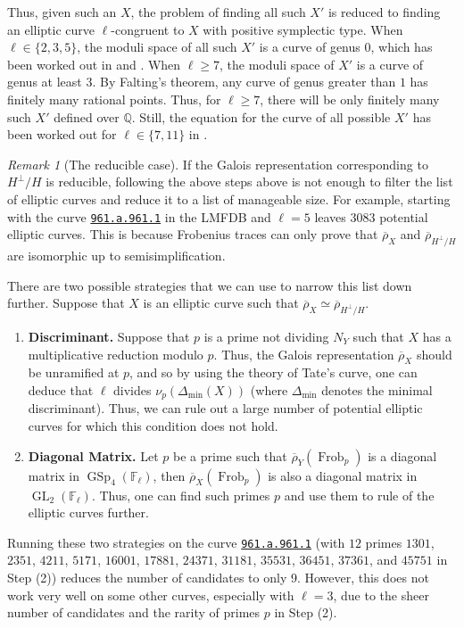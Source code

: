 \documentclass{amsproc}
\numberwithin{equation}{section}
\theoremstyle{definition}
\theoremstyle{remark}
\newtheorem{remark}[equation]{Remark}
\DeclareMathOperator{\GL}{GL}
\DeclareMathOperator{\GSp}{GSp}
\DeclareMathOperator{\Frob}{Frob}
\newcommand{\QQ}{\mathbb Q}
\newcommand{\FF}{\mathbb F}
\newcommand{\rhoHperpH}{\overline\rho_{H^\perp\!/H}}
\begin{document}
Thus, given such an $X$, the problem of finding all such $X'$ is reduced to finding an elliptic curve $\ell$-congruent to $X$ with positive symplectic type. When $\ell\in\{2,3,5\}$, the moduli space of all such $X'$ is a curve of genus $0$, which has been worked out in \cite{ec_gluable_family_2} and \cite{ec_gluable_family_3_5}. When $\ell\geq 7$, the moduli space of $X'$ is a curve of genus at least $3$. By Falting's theorem, any curve of genus greater than $1$ has finitely many rational points. Thus, for $\ell\geq 7$, there will be only finitely many such $X'$ defined over $\QQ$. Still, the equation for the curve of all possible $X'$ has been worked out for $\ell\in\{7,11\}$ in \cite{ec_gluable_family_7_11}.

\begin{remark}[The reducible case]
    \label{rmk:reducible}
If the Galois representation corresponding to $H^\perp/H$ is reducible, following the above steps above is not enough to filter the list of elliptic curves and reduce it to a list of manageable size. For example, starting with the curve \href{https://www.lmfdb.org/Genus2Curve/Q/961/a/961/1}{\texttt{961.a.961.1}} in the LMFDB and $\ell=5$ leaves $3083$ potential elliptic curves. This is because Frobenius traces can only prove that $\overline\rho_X$ and $\rhoHperpH$ are isomorphic up to semisimplification.

There are two possible strategies that we can use to narrow this list down further. Suppose that $X$ is an elliptic curve such that $\overline\rho_X\simeq\rhoHperpH$.
\begin{enumerate}
\item \textbf{Discriminant.} Suppose that $p$ is a prime not dividing $N_Y$ such that $X$ has a multiplicative reduction modulo $p$. Thus, the Galois representation $\overline\rho_X$ should be unramified at $p$, and so by using the theory of Tate's curve, one can deduce that $\ell$ divides $\nu_p(\Delta_{\min}(X))$ (where $\Delta_{\min}$ denotes the minimal discriminant).
Thus, we can rule out a large number of potential elliptic curves for which this condition does not hold.
\item \textbf{Diagonal Matrix.} Let $p$ be a prime such that $\overline\rho_Y(\Frob_p)$ is a diagonal matrix in $\GSp_4(\FF_\ell)$, then $\overline\rho_X(\Frob_p)$ is also a diagonal matrix in $\GL_2(\FF_\ell)$. 
Thus, one can find such primes $p$ and use them to rule of the elliptic curves further.
\end{enumerate}
Running these two strategies on the curve \href{https://www.lmfdb.org/Genus2Curve/Q/961/a/961/1}{\texttt{961.a.961.1}} (with $12$ primes $1301$, $2351$, $4211$, $5171$, $16001$, $17881$, $24371$, $31181$, $35531$, $36451$, $37361$, and $45751$ in Step (2)) reduces the number of candidates to only 9. However, this does not work very well on some other curves, especially with $\ell=3$, due to the sheer number of candidates and the rarity of primes $p$ in Step (2).
\end{remark}
\end{document}
